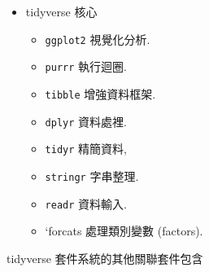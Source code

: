 \documentclass[
]{book}
\providecommand{\tightlist}{%
  \setlength{\itemsep}{0pt}\setlength{\parskip}{0pt}}
\begin{document}
\begin{itemize}
\tightlist
\item
  tidyverse 核心

  \begin{itemize}
  \tightlist
  \item
    \texttt{ggplot2} 視覺化分析.
  \item
    \texttt{purrr} 執行迴圈.
  \item
    \texttt{tibble} 增強資料框架.
  \item
    \texttt{dplyr} 資料處裡.
  \item
    \texttt{tidyr} 精簡資料,
  \item
    \texttt{stringr} 字串整理.
  \item
    \texttt{readr} 資料輸入.
  \item
    `forcats 處理類別變數 (factors).
  \end{itemize}
\end{itemize}

tidyverse 套件系統的其他關聯套件包含
\end{document}
